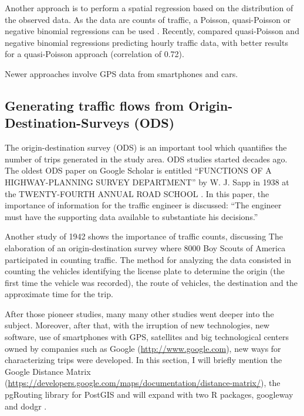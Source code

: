 \documentclass[12pt,graybox,envcountchap,sectrefs]{krantz}
\theoremstyle{definition}
\theoremstyle{definition}
\theoremstyle{definition}
\theoremstyle{remark}
\begin{document}
Another approach is to perform a spatial regression based on the
distribution of the observed data. As the data are counts of traffic, a
Poisson, quasi-Poisson or negative binomial regressions can be used
\citep{zeileis2008regression}. Recently, \citet{Ibarraetal2017a}
compared quasi-Poisson and negative binomial regressions predicting
hourly traffic data, with better results for a quasi-Poisson approach
(correlation of 0.72).

Newer approaches involve GPS data from smartphones and cars.

\subsection{Generating traffic flows from Origin-Destination-Surveys
(ODS)}\label{generating-traffic-flows-from-origin-destination-surveys-ods}

The origin-destination survey (ODS) is an important tool which
quantifies the number of trips generated in the study area. ODS studies
started decades ago. The oldest ODS paper on Google Scholar is entitled
``FUNCTIONS OF A HIGHWAY-PLANNING SURVEY DEPARTMENT'' by W. J. Sapp in
1938 at the TWENTY-FOURTH ANNUAL ROAD SCHOOL \citep{sapp1938runctions}.
In this paper, the importance of information for the traffic engineer is
discussed: ``The engineer must have the supporting data available to
substantiate his decisions.''

Another study of 1942 shows the importance of traffic counts, discussing
The elaboration of an origin-destination survey where 8000 Boy Scouts of
America participated in counting traffic. The method for analyzing the
data consisted in counting the vehicles identifying the license plate to
determine the origin (the first time the vehicle was recorded), the
route of vehicles, the destination and the approximate time for the
trip.

After those pioneer studies, many many other studies went deeper into
the subject. Moreover, after that, with the irruption of new
technologies, new software, use of smartphones with GPS, satellites and
big technological centers owned by companies such as Google
(\url{http://www.google.com}), new ways for characterizing trips were
developed. In this section, I will briefly mention the Google Distance
Matrix
(\url{https://developers.google.com/maps/documentation/distance-matrix/}),
the pgRouting library \citep{patrushev2007shortest} for PostGIS and will
expand with two R packages, googleway \citep{googleway} and dodgr
\citep{dodgr}.
\end{document}
